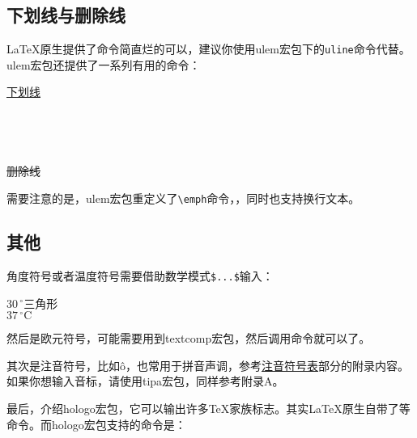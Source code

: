 {\subsection{下划线与删除线}
\LaTeX 原生提供了\latexline{\\underline}命令简直烂的可以，建议你使用ulem宏包下的\texttt{uline}命令代替。ulem宏包还提供了一系列有用的命令：

\begin{codeshow}
\uline{下划线} \\
 \\
 \\
 \\
 \\
\sout{删除线} \\
\end{codeshow}

需要注意的是，ulem宏包重定义了\verb|\emph|命令，，同时也支持换行文本。

\subsection{其他}
角度符号或者温度符号需要借助数学模式\verb|$...$|输入：

\begin{codeshow}
$30\,^{\circ}$三角形 \\
$37\,^{\circ}\mathrm{C}$
\end{codeshow}

然后是欧元符号，可能需要用到textcomp宏包，然后调用\latexline{\\texteuro}命令就可以了。

其次是注音符号，比如\^o，也常用于拼音声调，参考\hyperref[app:phonetic]{注音符号表}部分的附录内容。如果你想输入音标，请使用tipa宏包，同样参考附录A。

最后，介绍hologo宏包，它可以输出许多\TeX 家族标志。其实\LaTeX 原生自带了\latexline{\\LaTeX \TeX}等命令。而hologo宏包支持的命令是：

\begin{codeshow}
 
\end{codeshow}

}
